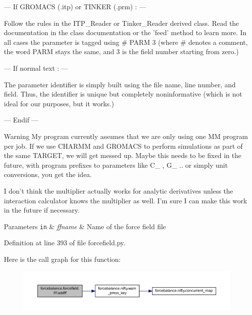 --- If G\-R\-O\-M\-A\-C\-S (.itp) or T\-I\-N\-K\-E\-R (.prm) \-: ---

Follow the rules in the I\-T\-P\-\_\-\-Reader or Tinker\-\_\-\-Reader derived class. Read the documentation in the class documentation or the 'feed' method to learn more. In all cases the parameter is tagged using {\ttfamily  \# P\-A\-R\-M 3 } (where \# denotes a comment, the word P\-A\-R\-M stays the same, and 3 is the field number starting from zero.)

--- If normal text \-: ---

The parameter identifier is simply built using the file name, line number, and field. Thus, the identifier is unique but completely noninformative (which is not ideal for our purposes, but it works.)

--- Endif ---

\begin{DoxyWarning}{Warning}
My program currently assumes that we are only using one M\-M program per job. If we use C\-H\-A\-R\-M\-M and G\-R\-O\-M\-A\-C\-S to perform simulations as part of the same T\-A\-R\-G\-E\-T, we will get messed up. Maybe this needs to be fixed in the future, with program prefixes to parameters like C\-\_\- , G\-\_\- .. or simply unit conversions, you get the idea.

I don't think the multiplier actually works for analytic derivatives unless the interaction calculator knows the multiplier as well. I'm sure I can make this work in the future if necessary.
\end{DoxyWarning}

\begin{DoxyParams}[1]{Parameters}
\mbox{\tt in}  & {\em ffname} & Name of the force field file \\
\hline
\end{DoxyParams}


Definition at line 393 of file forcefield.\-py.



Here is the call graph for this function\-:\nopagebreak
\begin{figure}[H]
\begin{center}
\leavevmode
\includegraphics[width=350pt]{classforcebalance_1_1forcefield_1_1FF_a142d41c86b9b0ef57f93ec6fb349357b_cgraph}
\end{center}
\end{figure}


